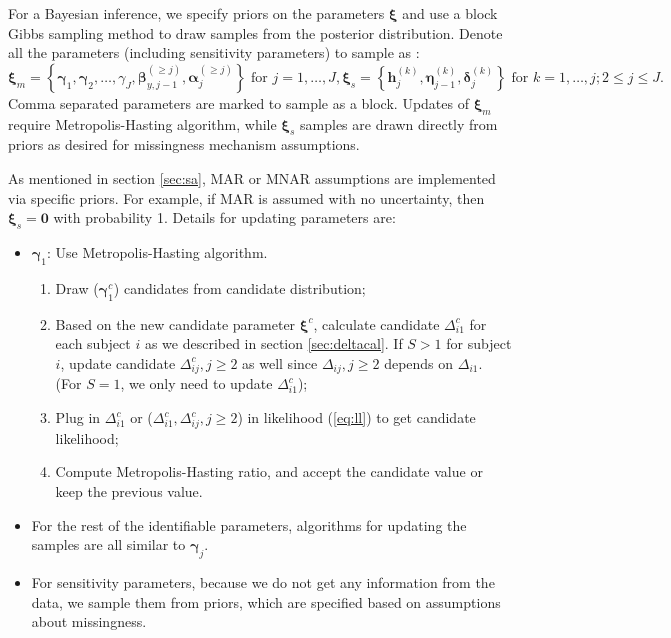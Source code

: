 \documentclass[12pt]{article}
\begin{document}
For a Bayesian inference, we specify priors on the parameters $\bm
\xi$ and use a block Gibbs sampling method to draw samples from the
posterior distribution. Denote all the parameters (including
sensitivity parameters) to sample as :
\begin{displaymath}
  \bm \xi_m = \left\{ \bm \gamma_1, \bm \gamma_2, \ldots, \gamma_J,
    \bm \beta_{y,j-1}^{(\geq j)}, \bm \alpha_j^{(\geq j)} \right\}
    \text{ for } j = 1, \ldots, J ,
  \bm \xi_s = \left\{ \bm h_j^{(k)}, \bm \eta_{j-1}^{(k)}, \bm \delta_j^{(k)}
\right\}
    \text{ for } k = 1, \ldots, j; 2 \leq j \leq J.
\end{displaymath}
Comma separated parameters are marked to sample as a block.  Updates
of $\bm \xi_m$ require Metropolis-Hasting algorithm, while $\bm \xi_s$
samples are drawn directly from priors as desired for missingness
mechanism assumptions.

As mentioned in section \ref{sec:sa}, MAR or MNAR assumptions are
implemented via specific priors. For example, if MAR is assumed with
no uncertainty, then $ \bm \xi _s= \bm 0$ with probability 1. Details
for updating parameters are:

\begin{itemize}
\item $\bm \gamma_{1} $: Use Metropolis-Hasting algorithm.
  \begin{enumerate}
  \item Draw ($\bm \gamma_{1}^c$) candidates from candidate
    distribution;
  \item Based on the new candidate parameter $\bm \xi^c$, calculate
    candidate $\Delta_{i1}^c$ for each subject $i$ as we described in
    section \ref{sec:deltacal}. If $S > 1$ for subject $i$, update
    candidate $\Delta_{ij}^c, j \geq 2$ as well since $\Delta_{ij}, j
    \geq 2$ depends on $\Delta_{i1}$. (For $S = 1$, we only need to
    update $\Delta_{i1}^c$);
  \item Plug in $\Delta_{i1}^c$ or ($\Delta_{i1}^c, \Delta_{ij}^c, j
    \geq 2$) in likelihood (\ref{eq:ll}) to get candidate likelihood;
  \item Compute Metropolis-Hasting ratio, and accept the candidate
    value or keep the previous value.
  \end{enumerate}
\item For the rest of the identifiable parameters, algorithms for
  updating the samples are all similar to $\bm \gamma_j$.
\item For sensitivity parameters, because we do not get any
  information from the data, we sample them from priors, which are
  specified based on assumptions about  missingness.
\end{itemize}
\end{document}
